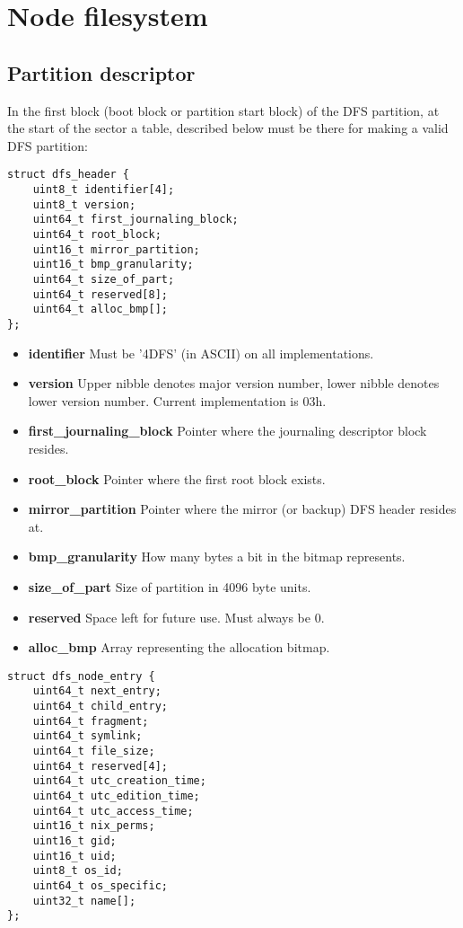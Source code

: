 \documentclass[12pt]{article}
\begin{document}
\section{Node filesystem}

\subsection{Partition descriptor}

In the first block (boot block or partition start block) of the DFS partition, at the start of the sector a table, described below must be there for making a valid DFS partition:

\begin{verbatim}
struct dfs_header {
	uint8_t identifier[4];
	uint8_t version;
	uint64_t first_journaling_block;
	uint64_t root_block;
	uint16_t mirror_partition;
	uint16_t bmp_granularity;
	uint64_t size_of_part;
	uint64_t reserved[8];
	uint64_t alloc_bmp[];
};
\end{verbatim}

\begin{itemize}
	\item \textbf{identifier} Must be '4DFS' (in ASCII) on all implementations.
	\item \textbf{version} Upper nibble denotes major version number, lower nibble denotes lower version number. Current implementation is 03h.
	\item \textbf{first\_journaling\_block} Pointer where the journaling descriptor block resides.
	\item \textbf{root\_block} Pointer where the first root block exists.
	\item \textbf{mirror\_partition} Pointer where the mirror (or backup) DFS header resides at.
	\item \textbf{bmp\_granularity} How many bytes a bit in the bitmap represents.
	\item \textbf{size\_of\_part} Size of partition in 4096 byte units.
	\item \textbf{reserved} Space left for future use. Must always be 0.
	\item \textbf{alloc\_bmp} Array representing the allocation bitmap.
\end{itemize}

\begin{verbatim}
struct dfs_node_entry {
	uint64_t next_entry;
	uint64_t child_entry;
	uint64_t fragment;
	uint64_t symlink;
	uint64_t file_size;
	uint64_t reserved[4];
	uint64_t utc_creation_time;
	uint64_t utc_edition_time;
	uint64_t utc_access_time;
	uint16_t nix_perms;
	uint16_t gid;
	uint16_t uid;
	uint8_t os_id;
	uint64_t os_specific;
	uint32_t name[];
};
\end{verbatim}
\end{document}
